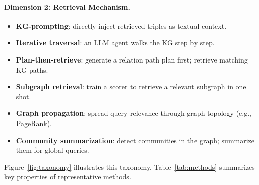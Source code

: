 \documentclass[11pt]{article}
\begin{document}
\paragraph{Dimension 2: Retrieval Mechanism.}
\begin{itemize}
  \item \textbf{KG-prompting}: directly inject retrieved triples as textual context.
  \item \textbf{Iterative traversal}: an LLM agent walks the KG step by step.
  \item \textbf{Plan-then-retrieve}: generate a relation path plan first; retrieve matching KG paths.
  \item \textbf{Subgraph retrieval}: train a scorer to retrieve a relevant subgraph in one shot.
  \item \textbf{Graph propagation}: spread query relevance through graph topology (e.g., PageRank).
  \item \textbf{Community summarization}: detect communities in the graph; summarize them for global queries.
\end{itemize}

Figure~\ref{fig:taxonomy} illustrates this taxonomy. Table~\ref{tab:methods} summarizes key properties of representative methods.
\end{document}
